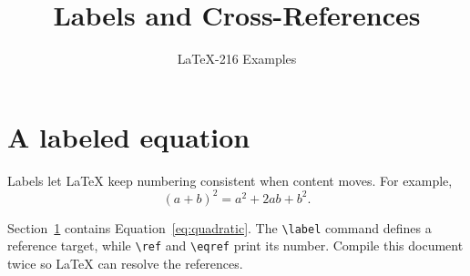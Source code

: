 \documentclass{article}
\title{Labels and Cross-References}
\author{LaTeX-216 Examples}
\date{}
\begin{document}
\maketitle

\section{A labeled equation}\label{sec:equation}
Labels let LaTeX keep numbering consistent when content moves. For example,
\begin{equation}\label{eq:quadratic}
  (a+b)^2 = a^2 + 2ab + b^2.
\end{equation}

Section~\ref{sec:equation} contains Equation~\eqref{eq:quadratic}. The
\verb|\label| command defines a reference target, while \verb|\ref| and
\verb|\eqref| print its number. Compile this document twice so LaTeX can
resolve the references.
\end{document}
